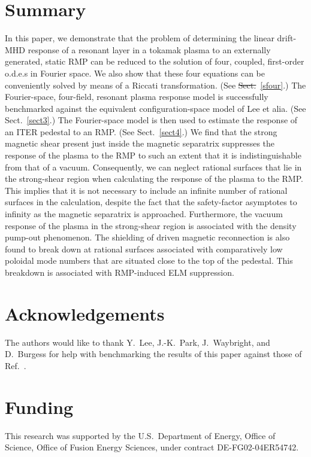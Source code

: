 \documentclass[12pt,prb,aps]{revtex4-1}
\providecommand{\DIFadd}[1]{{\protect\color{blue}\uwave{#1}}} %
\providecommand{\DIFdel}[1]{{\protect\color{red}\sout{#1}}}                      %
\providecommand{\DIFaddbegin}{} %
\providecommand{\DIFaddend}{} %
\providecommand{\DIFdelbegin}{} %
\providecommand{\DIFdelend}{} %
\begin{document}
\section{Summary}\label{sect5}
In this paper, we  demonstrate that the problem of determining  the linear drift-MHD response of a resonant layer in a tokamak plasma to an externally generated, static  RMP can  be reduced to
the solution of  four, coupled, first-order o.d.e.s in Fourier space. 
We also show that these 
four equations  can be conveniently solved by means of a Riccati transformation. (See \DIFdelbegin \DIFdel{Sect.}\DIFdelend \DIFaddbegin \DIFadd{Appendix}\DIFaddend ~\ref{sfour}.) The Fourier-space, four-field, resonant plasma response model is successfully benchmarked against the equivalent configuration-space model of Lee et alia.\cite{lee} (See Sect.~\ref{sect3}.) The Fourier-space model is then used to
estimate the response of an ITER pedestal to an RMP. (See Sect.~\ref{sect4}.) We find that the strong magnetic shear present just inside the magnetic
separatrix  suppresses the response of the plasma to the RMP to such an extent that it is indistinguishable from that
of a vacuum.\cite{rf2025} Consequently, we can neglect rational surfaces that lie in the strong-shear region when calculating the response of the plasma to the RMP. This implies
that it is not necessary to include an infinite number of rational surfaces in the calculation, despite the fact that the safety-factor asymptotes to infinity
as the magnetic separatrix is approached.  Furthermore, the vacuum response of the plasma in the strong-shear region is associated with the density pump-out phenomenon. The shielding of driven magnetic reconnection is also found to break down at rational surfaces associated with comparatively low
poloidal mode numbers that are situated close to the top of the pedestal. This breakdown is associated with RMP-induced ELM suppression.  

\section*{Acknowledgements}
The authors would like to thank   Y.~Lee, J.-K.~Park, J.~Waybright, and D.~Burgess for help with benchmarking the results of this paper against those of
Ref.~. 

\section*{Funding}
This research was supported by the U.S.\ Department of Energy, Office of Science, Office of Fusion Energy Sciences,  under  contract DE-FG02-04ER54742. 
\end{document}
